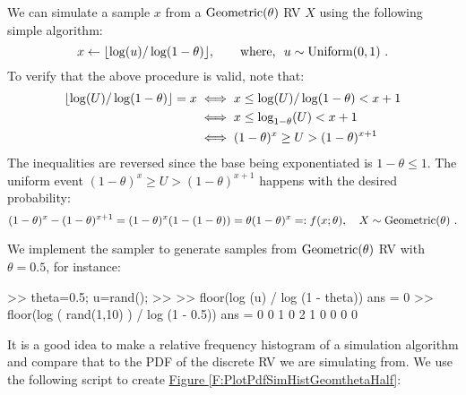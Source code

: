 \begin{simulation}[$\geometric(\theta)$]\label{SIM:Geometric}
We can simulate a sample $x$ from a $\geometric(\theta)$ RV $X$ using the following simple algorithm:
\[
x \gets \lfloor \log(u) / \log(1-\theta) \rfloor, \qquad \text{where, } \ u \sim \uniform(0,1) \ .
\]
To verify that the above procedure is valid, note that:
\begin{align}
\lfloor \log(U) / \log(1-\theta) \rfloor = x
& \iff x \leq  \log(U) / \log(1-\theta) < x+1 \notag \\
& \iff x \leq  \log_{1-\theta}(U) < x+1 \notag \\
& \iff (1-\theta)^x \geq U > (1-\theta) ^{x+1} \notag
\end{align}
The inequalities are reversed since the base being exponentiated is $1-\theta \leq 1$.  The uniform event $(1-\theta)^x \geq U > (1-\theta) ^{x+1}$ happens with the desired probability:
$$(1-\theta) ^{x}-(1-\theta) ^{x+1} = (1-\theta) ^{x}(1-(1-\theta)) = \theta (1-\theta) ^{x} =: f(x;\theta), \quad X \sim \mbox{{\rm Geometric}}(\theta) \ .$$

We implement the sampler to generate samples from $\geometric(\theta)$ RV with $\theta=0.5$, for instance:
\begin{VrbM}
>> theta=0.5; u=rand(); %
>> %
>> floor(log (u) / log (1 - theta))
ans =     0
>> floor(log ( rand(1,10) ) / log (1 - 0.5)) %
ans =     0     0     1     0     2     1     0     0     0     0
\end{VrbM}
\end{simulation}

\begin{labwork}\label{LW:RelFreqHistForGeomSims}
It is a good idea to make a relative frequency histogram of a simulation algorithm and compare that to the PDF of the discrete RV we are simulating from.  We use the following script to create \hyperref[F:PlotPdfSimHistGeomthetaHalf]{Figure \ref*{F:PlotPdfSimHistGeomthetaHalf}}:
\end{labwork}

